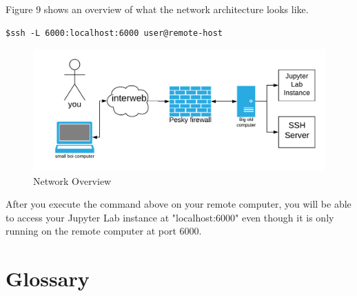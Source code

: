 \documentclass[pdftex,12pt]{artikel3}
\begin{document}
Figure 9 shows an overview of what the network architecture looks like.

\begin{lstlisting}[caption=SSH command for local port forwarding]
$ssh -L 6000:localhost:6000 user@remote-host
\end{lstlisting}

\begin{figure}[h!]
    \centering
    \includegraphics[width=15cm]{remoteJupyter.png}
    \caption{Network Overview}
    \label{fig:jupyter_server}
\end{figure}

After you execute the command above on your remote computer, you
will be able to access your Jupyter Lab instance at "localhost:6000" even though it is only running on the remote computer at port 6000.

\newpage

\section{Glossary}
\end{document}
